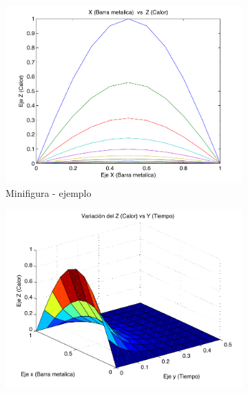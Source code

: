 \documentclass[a4paper, 11pt]{article}
\begin{document}
        
        \begin{figure}[ht]
            \centering
            \begin{subfigure}[b]{0.49\textwidth}
                \centering
                \includegraphics[width = \textwidth]{04_ENTORNOS_FLOTANTES/images/Grafica2D.pdf}
                \caption{Minifigura - ejemplo}
                \label{fig: Minifigura - ejemplo}
            \end{subfigure}
            \hfill 
            \begin{subfigure}[b]{0.49\textwidth}
                \centering
                \includegraphics[width = \textwidth]{04_ENTORNOS_FLOTANTES/images/Grafica3D.pdf}

\end{subfigure}
\end{figure}
\end{document}
